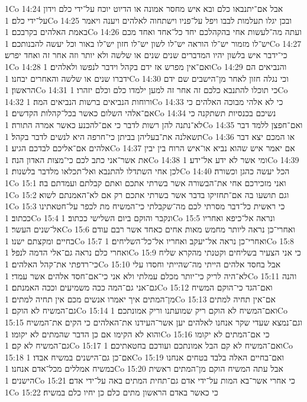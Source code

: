1Co 14:24  אבל אם־יתנבאו כלם ובא איש מחסר אמונה או הדיוט יוכח על־ידי כלם וידון על־ידי כלם׃
1Co 14:25  ובכן יגלו תעלמות לבבו ויפל על־פניו וישתחוה לאלהים ויענה ויאמר באמת האלהים בקרבכם׃
1Co 14:26  ועתה מה־לעשות אחי בהקהלכם יחד כל־אחד ואחד מכם יש־לו מזמור יש־לו הוראה יש־לו לשון יש־לו חזון יש־לו באור וכל יעשה להבנותכם׃
1Co 14:27  כי־ידבר איש בלשון יהיו המדברים שנים שנים או שלשה ולא יותר וזה אחר זה ואחד יפרש׃
1Co 14:28  ואם־אין מפרש אז ידם בקהל וידבר לנפשו ולאלהים׃
1Co 14:29  והנביאים הם ידברו שנים או שלשה והאחרים יבחנו׃
1Co 14:30  וכי נגלה חזון לאחר מן־הישבים שם ידם הראשון׃
1Co 14:31  כי תוכלו להתנבא כלכם זה אחר זה למען ילמדו כלם וכלם יזהרו׃
1Co 14:32  ורוחות הנביאים ברשות הנביאים המה׃
1Co 14:33  כי לא אלהי מבוכה האלהים כי אם־אלהי השלום כאשר בכל־קהלות הקדשים׃
1Co 14:34  נשיכם בכנסיות תשתקנה כי לא־נתנה להן רשות לדבר כי אם־להכנע כאשר אמרה התורה׃
1Co 14:35  ואם־חפצן ללמד דבר תשאלנה את־בעליהן בביתן כי־חרפה היא לנשים לדבר בקהל׃
1Co 14:36  או המכם יצא דבר אלהים אם־אליכם לבדכם הגיע׃
1Co 14:37  אם יאמר איש שהוא נביא או־איש הרוח בין יבין את אשר־אני כתב לכם כי־מצות האדון הנה׃
1Co 14:38  ומי אשר לא ידע אל־ידע׃
1Co 14:39  לכן אחי השתדלו להתנבא ואל־תכלאו מלדבר בלשנות׃
1Co 14:40  הכל יעשה כהגן וכשורה׃
1Co 15:1  ואני מזכירכם אחי את־הבשורה אשר בשרתי אתכם ואתם קבלתם ועמדתם בה׃
1Co 15:2  וגם תושעו בה אם־תחזיקו בדבר אשר בשרתי אתכם רק אם לא־האמנתם לשוא׃
1Co 15:3  כי ראשית כל־דבר מסרתי לכם מה־שקבלתי כי־המשיח מת לכפר על־חטאתינו ככתוב׃
1Co 15:4  ונקבר והוקם ביום השלישי ככתוב׃
1Co 15:5  ונראה אל־כיפא ואחריו אל־שנים העשר׃
1Co 15:6  ואחרי־כן נראה ליותר מחמש מאות אחים כאחד אשר רבם עודם בחיים ומקצתם ישנו׃
1Co 15:7  ואחרי־כן נראה אל־יעקב ואחריו אל־כל־השליחים׃
1Co 15:8  ואחרי כלם נראה גם־אלי הדמה לנפל׃
1Co 15:9  כי אני הצעיר בשליחים וקטנתי מהקרא שליח כי־רדפתי את־קהל האלהים׃
1Co 15:10  אבל בחסד אלהים הייתי מה־שהייתי וחסדו עלי לא־היה לריק כי־יותר מכלם עמלתי ולא אני כי־אם־חסד אלהים אשר עמדי׃
1Co 15:11  והנה גם־אני גם־המה ככה משמיעים וככה האמנתם׃
1Co 15:12  ואם־הגד כי־הוקם המשיח מן־המתים איך יאמרו אנשים מכם אין תחיה למתים׃
1Co 15:13  אם־אין תחיה למתים גם־המשיח לא הוקם׃
1Co 15:14  ואם־המשיח לא הוקם ריק שמועתנו וריק אמונתכם׃
1Co 15:15  וגם־נמצא שעדי שקר אנחנו לאלהים יען אשר־העידנו את־האלהים כי הקים את־המשיח והוא לא הקימו אם כן הדבר שהמתים לא יקומו׃
1Co 15:16  כי אם־המתים לא יקומו גם־המשיח לא קם׃
1Co 15:17  ואם־המשיח לא קם הבל אמונתכם ועודכם בחטאתיכם׃
1Co 15:18  אם־כן גם־הישנים במשיח אבדו׃
1Co 15:19  ואם־בחיים האלה בלבד בטחים אנחנו במשיח אמללים מכל־אדם אנחנו׃
1Co 15:20  אבל עתה המשיח הוקם מן־המתים ראשית הישנים׃
1Co 15:21  כי אחרי אשר־בא המות על־ידי אדם גם־תחית המתים באה על־ידי אדם׃
1Co 15:22  כי כאשר באדם הראשון מתים כלם כן יחיו כלם במשיח׃
